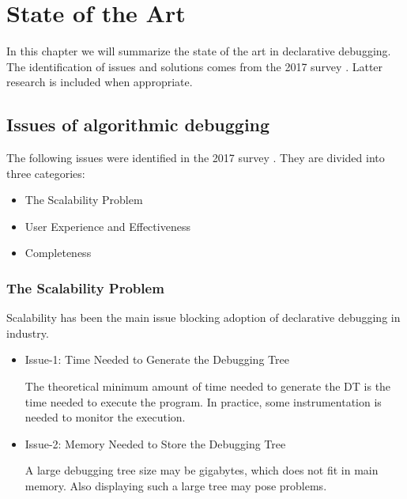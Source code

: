 \chapter{State of the Art}
\label{cap:estadoDeLaCuestion}

In this chapter we will summarize the state of the art in declarative debugging.
%
The identification of issues and solutions comes from the 2017 survey \cite{Survey}. Latter research is included when appropriate.

\section{Issues of algorithmic debugging}
The following issues were identified in the 2017 survey \cite{Survey}. They are divided into three categories:
\begin{itemize}
    \item The Scalability Problem
    \item User Experience and Effectiveness
    \item Completeness
\end{itemize}
\subsection{The Scalability Problem}
Scalability has been the main issue blocking adoption of declarative debugging in industry.
\begin{itemize}
    \item Issue-1: Time Needed to Generate the Debugging Tree
    
The theoretical minimum amount of time needed to generate the DT is the time needed to execute the program. In practice, some instrumentation is needed to monitor the execution.
    \item Issue-2: Memory Needed to Store the Debugging Tree

A large debugging tree size may be gigabytes, which does not fit in main memory. Also displaying such a large tree may pose problems.
\end{itemize}
